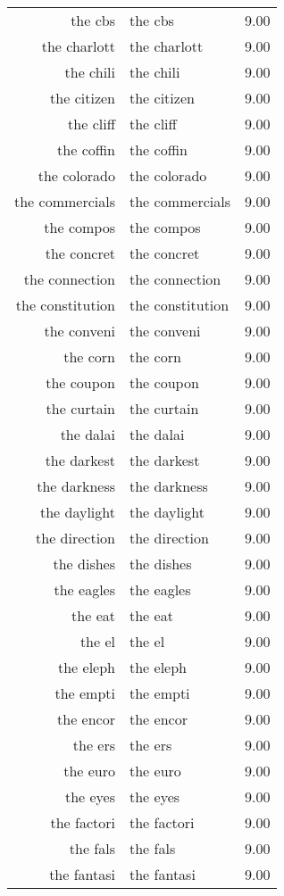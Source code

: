 \begin{table}[ht]
\begin{tabular}{rlr}
  the cbs & the cbs & 9.00 \\ 
  the charlott & the charlott & 9.00 \\ 
  the chili & the chili & 9.00 \\ 
  the citizen & the citizen & 9.00 \\ 
  the cliff & the cliff & 9.00 \\ 
  the coffin & the coffin & 9.00 \\ 
  the colorado & the colorado & 9.00 \\ 
  the commercials & the commercials & 9.00 \\ 
  the compos & the compos & 9.00 \\ 
  the concret & the concret & 9.00 \\ 
  the connection & the connection & 9.00 \\ 
  the constitution & the constitution & 9.00 \\ 
  the conveni & the conveni & 9.00 \\ 
  the corn & the corn & 9.00 \\ 
  the coupon & the coupon & 9.00 \\ 
  the curtain & the curtain & 9.00 \\ 
  the dalai & the dalai & 9.00 \\ 
  the darkest & the darkest & 9.00 \\ 
  the darkness & the darkness & 9.00 \\ 
  the daylight & the daylight & 9.00 \\ 
  the direction & the direction & 9.00 \\ 
  the dishes & the dishes & 9.00 \\ 
  the eagles & the eagles & 9.00 \\ 
  the eat & the eat & 9.00 \\ 
  the el & the el & 9.00 \\ 
  the eleph & the eleph & 9.00 \\ 
  the empti & the empti & 9.00 \\ 
  the encor & the encor & 9.00 \\ 
  the ers & the ers & 9.00 \\ 
  the euro & the euro & 9.00 \\ 
  the eyes & the eyes & 9.00 \\ 
  the factori & the factori & 9.00 \\ 
  the fals & the fals & 9.00 \\ 
  the fantasi & the fantasi & 9.00 \\ 

\end{tabular}
\end{table}
